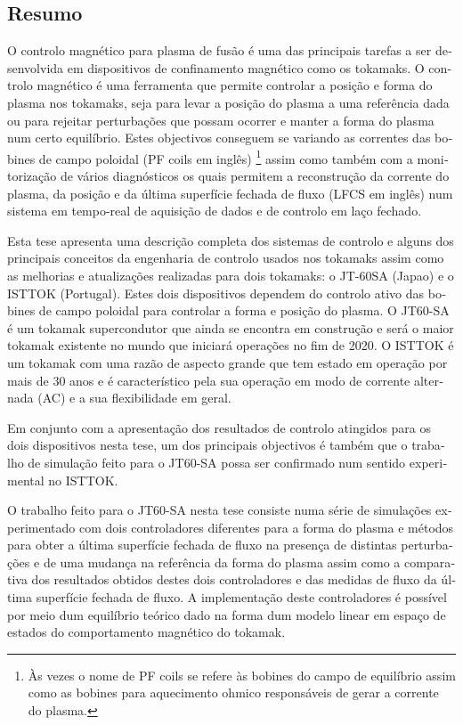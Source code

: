 \pagebreak
\begin{otherlanguage}{portuguese}
\chapter*{Resumo}


O controlo magnético para plasma de fusão é uma das principais tarefas a ser desenvolvida em dispositivos de confinamento magnético como os tokamaks. O controlo magnético é uma ferramenta que permite controlar a posição e forma do plasma nos tokamaks, seja para levar a posição do plasma a uma referência dada  ou para rejeitar perturbações que possam ocorrer e manter a forma do plasma num certo equilíbrio.  Estes objectivos conseguem se variando as correntes das bobines de campo poloidal (PF coils em inglês) \footnote{Às vezes o nome de PF coils se refere às bobines do campo de equilíbrio assim como as bobines para aquecimento ohmico responsáveis de gerar a corrente do plasma.} assim como também com a  monitorização de vários diagnósticos os quais permitem a reconstrução da corrente do plasma, da posição e da última superfície fechada de fluxo (LFCS em inglês) num sistema em tempo-real de aquisição de dados e de controlo em laço fechado.\smallskip

Esta tese apresenta uma descrição completa dos sistemas de controlo e alguns dos principais conceitos da engenharia de controlo usados nos tokamaks assim como as melhorias e atualizações realizadas para dois tokamaks: o JT-60SA (Japao) e o ISTTOK (Portugal). Estes dois dispositivos dependem do controlo ativo das bobines de campo poloidal para controlar a forma e posição do plasma. O JT60-SA é um tokamak supercondutor que ainda se encontra em construção e será o maior tokamak existente no mundo que iniciará operações no fim de 2020. O ISTTOK é um tokamak com uma razão de aspecto grande que tem estado em operação por mais de 30 anos e é característico pela sua operação em modo de corrente alternada (AC) e a sua flexibilidade em geral.\smallskip

Em conjunto com a apresentação dos resultados de controlo atingidos para os dois dispositivos nesta tese, um dos principais objectivos é também que o trabalho de simulação feito para o JT60-SA possa ser confirmado num sentido experimental no ISTTOK.\smallskip

O trabalho feito para o JT60-SA nesta tese consiste numa série de simulações experimentado com dois controladores diferentes para a forma do plasma e métodos para obter a última superfície fechada de fluxo na presença de distintas perturbações e de uma mudança na referência da forma do plasma assim como a comparativa dos resultados obtidos destes dois controladores e  das medidas de fluxo da última superfície fechada de fluxo. A implementação deste controladores é  possível por meio dum equilíbrio teórico dado na forma dum modelo linear em espaço de estados do comportamento magnético do tokamak.
\smallskip


\end{otherlanguage}
